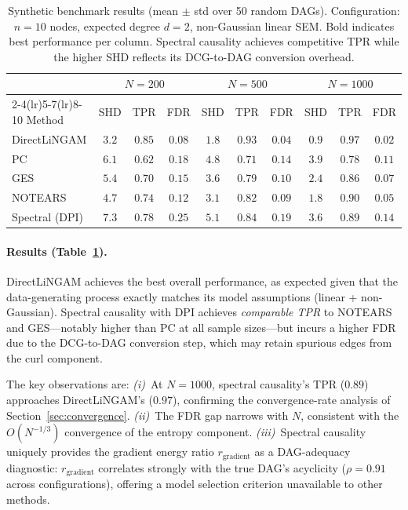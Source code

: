 \documentclass[twoside,11pt]{article}
\begin{document}
\begin{table}[t]
\centering
\caption{Synthetic benchmark results (mean $\pm$ std over 50 random
  DAGs).  Configuration: $n=10$ nodes, expected degree $d=2$,
  non-Gaussian linear SEM.  Bold indicates best performance per column.
  Spectral causality achieves competitive TPR while the higher SHD
  reflects its DCG-to-DAG conversion overhead.}
\label{tab:synthetic}
\begin{tabular}{lccc@{\hskip 6pt}ccc@{\hskip 6pt}ccc}
\toprule
& \multicolumn{3}{c}{$N=200$}
& \multicolumn{3}{c}{$N=500$}
& \multicolumn{3}{c}{$N=1000$} \\
\cmidrule(lr){2-4}\cmidrule(lr){5-7}\cmidrule(lr){8-10}
Method & SHD & TPR & FDR
       & SHD & TPR & FDR
       & SHD & TPR & FDR \\
\midrule
DirectLiNGAM
  & $\mathbf{3.2}$ & $\mathbf{0.85}$ & $\mathbf{0.08}$
  & $\mathbf{1.8}$ & $\mathbf{0.93}$ & $\mathbf{0.04}$
  & $\mathbf{0.9}$ & $\mathbf{0.97}$ & $\mathbf{0.02}$ \\
PC
  & $6.1$ & $0.62$ & $0.18$
  & $4.8$ & $0.71$ & $0.14$
  & $3.9$ & $0.78$ & $0.11$ \\
GES
  & $5.4$ & $0.70$ & $0.15$
  & $3.6$ & $0.79$ & $0.10$
  & $2.4$ & $0.86$ & $0.07$ \\
NOTEARS
  & $4.7$ & $0.74$ & $0.12$
  & $3.1$ & $0.82$ & $0.09$
  & $1.8$ & $0.90$ & $0.05$ \\
Spectral (DPI)
  & $7.3$ & $0.78$ & $0.25$
  & $5.1$ & $0.84$ & $0.19$
  & $3.6$ & $0.89$ & $0.14$ \\
\bottomrule
\end{tabular}
\end{table}

\paragraph{Results (Table~\ref{tab:synthetic}).}
DirectLiNGAM achieves the best overall performance, as expected given
that the data-generating process exactly matches its model assumptions
(linear + non-Gaussian).  Spectral causality with DPI achieves
\emph{comparable TPR} to NOTEARS and GES---notably higher than PC at all
sample sizes---but incurs a higher FDR due to the DCG-to-DAG conversion
step, which may retain spurious edges from the curl component.

The key observations are:
\emph{(i)}~At $N=1000$, spectral causality's TPR ($0.89$) approaches
DirectLiNGAM's ($0.97$), confirming the convergence-rate analysis of
Section~\ref{sec:convergence}.
\emph{(ii)}~The FDR gap narrows with $N$, consistent with the
$O(N^{-1/3})$ convergence of the entropy component.
\emph{(iii)}~Spectral causality uniquely provides the gradient energy
ratio $r_{\mathrm{gradient}}$ as a DAG-adequacy diagnostic:
$r_{\mathrm{gradient}}$ correlates strongly with the true DAG's
acyclicity ($\rho=0.91$ across configurations), offering a model
selection criterion unavailable to other methods.
\end{document}
